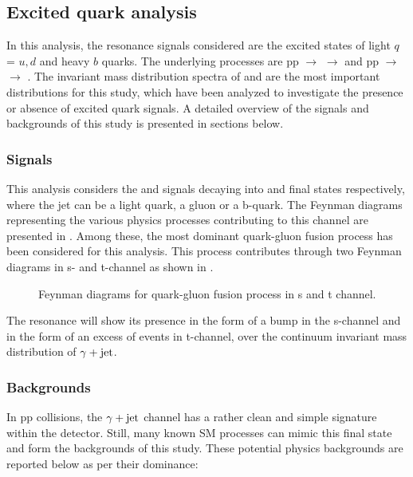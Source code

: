 \subsection{Excited quark analysis}
In this analysis, the resonance signals considered are the excited states of light $q$ = $u,d$ and heavy $b$ quarks. The underlying processes are
pp $\rightarrow$ \qstar $\rightarrow$ \gamjet and pp $\rightarrow$ \bstar $\rightarrow$ \gambjet. The invariant mass distribution spectra of \gamjet and \gambjet
are the most important distributions for this study, which have been analyzed to investigate the presence or absence of excited quark signals.
A detailed overview of the signals and backgrounds of this study is presented in sections below.
\subsubsection{Signals}
This analysis considers the \qstar and \bstar signals decaying into \gamjet and \gambjet final states respectively,
where the jet can be a light quark, a gluon or a b-quark.
The Feynman diagrams representing the various physics processes contributing to this channel are presented in \fig{\ref{fig:qstarSig}}.
Among these, the most dominant quark-gluon
fusion process has been considered for this analysis. This process contributes through two Feynman diagrams in s- and t-channel as shown in \fig{\ref{fig:qgFusion_s_t}}.

\begin{figure}[h]
\begin{center}
\hspace{0.1 in}
\hspace{0.1 in}
\caption{Feynman diagrams for quark-gluon fusion process in s and t channel.}
\label{fig:qgFusion_s_t}
\end{center}
\end{figure}

The resonance will show its presence in the form of a bump in the s-channel and in the form of an excess of events in t-channel,
over the continuum invariant mass distribution of $\gamma+\mathrm{jet}$.
\subsubsection{Backgrounds}
In pp collisions, the $\gamma+\mathrm{jet}$ channel has a rather clean and simple signature within the detector. Still, many known SM processes can mimic this final state and
form the backgrounds of this study. These potential physics backgrounds are reported below as per their dominance:
